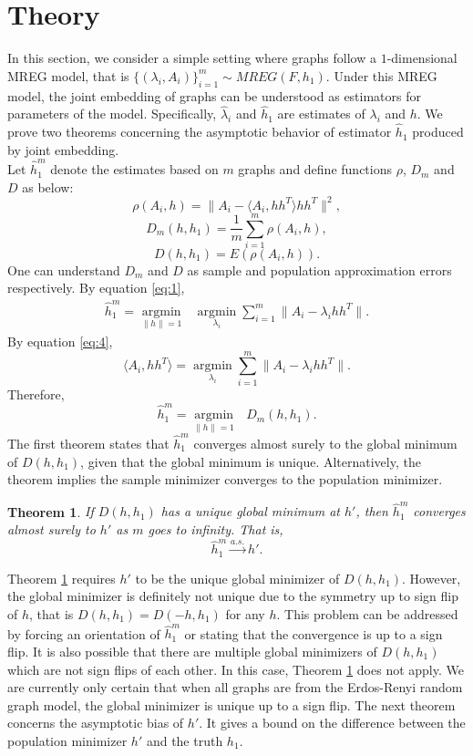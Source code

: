 \documentclass[10pt,journal,compsoc]{IEEEtran}
\newtheorem{theorem}{Theorem}[section]
\begin{document}
\section{Theory}
In this section, we consider a simple setting where graphs follow a $1$-dimensional MREG model, that is $\{(\lambda_i,A_i)\} _{i=1}^m \sim MREG(F,h_1)$. Under this MREG model, the joint embedding of graphs can be understood as estimators for parameters of the model. Specifically, $\hat{\lambda}_i$ and $\hat{h}_1$ are estimates of $\lambda_i$ and $h$. We prove two theorems concerning the asymptotic behavior of estimator $\hat{h}_1$ produced by joint embedding. \\

\noindent Let $\hat{h}_1^m$ denote the estimates based on $m$ graphs and define functions $\rho$, $D_m$ and $D$ as below: 
\[ \rho(A_i,h)= \|A_i- \langle A_i,h h^T \rangle h h^T\|^2, \]
\[ D_m(h,h_1) =\frac{1}{m}\sum_{i=1}^{m} \rho(A_i,h), \]
\[ D(h,h_1) = E(\rho(A_i,h)). \]
One can understand $D_m$ and $D$ as sample and population  approximation errors respectively. By equation \eqref{eq:1},
\begin{align*} 
\hat{h}_1^m = \underset{\|h\| =1}{\operatorname{argmin}} \text{ }   \underset{\lambda_i}{\operatorname{argmin}} \sum_{i=1}^{m} \|A_i - \lambda_i h h^T\| .
\end{align*}
By equation \eqref{eq:4}, 
\[\langle A_i,hh^T \rangle=\underset{\lambda_i}{\operatorname{argmin}} \sum_{i=1}^{m} \|A_i - \lambda_i h h^T\|.\]
Therefore,
\[\hat{h}_1^m = \underset{\|h\| =1}{\operatorname{argmin}} \text{ } D_m(h,h_1). \]
The first theorem states that $\hat{h}_1^m$  converges almost surely to the global minimum of $D(h,h_1)$, given that the global minimum is unique. Alternatively, the theorem implies the sample minimizer converges to the population minimizer.
\begin{theorem}
\label{thm:1}
If $D(h,h_1)$ has a unique global minimum at $h'$, then $\hat{h}_1^m$ converges almost surely to $h'$ as $m$ goes to infinity. That is, 
\[ \hat{h}_1^m \overset{a.s.}{\rightarrow} h'. \]
\end{theorem}

\noindent Theorem \ref{thm:1} requires $h'$ to be the unique global minimizer of $D(h,h_1)$. However, the global minimizer is definitely not unique due to the symmetry up to sign flip of $h$, that is $D(h,h_1)=D(-h,h_1)$ for any $h$. This problem can be addressed by forcing an orientation of $\hat{h}_1^m$ or stating that the convergence is up to a sign flip. It is also possible that there are multiple global minimizers of $D(h,h_1)$ which are not sign flips of each other. In this case, Theorem \ref{thm:1} does not apply. We are currently only certain that when all graphs are from the Erdos-Renyi random graph model, the global minimizer is unique up to a sign flip. The next theorem concerns the asymptotic bias of $h'$. It gives a bound on the difference between the population minimizer  $h'$ and the truth $h_1$.
\end{document}
